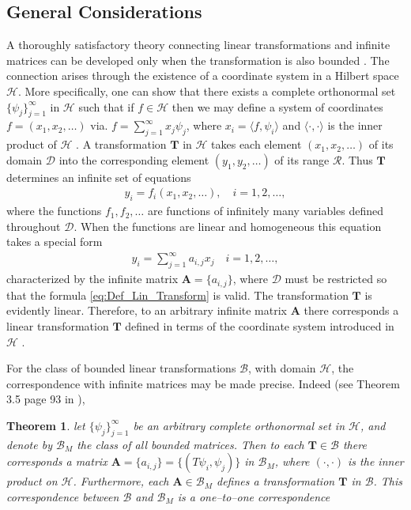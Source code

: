 \documentclass[english,12pt]{ttuthes}
\newtheorem{theorem}{Theorem}[chapter]
\begin{document}
\subsection{General Considerations}\label{sec:General_Considerations}
%
A thoroughly satisfactory theory connecting linear transformations and
infinite matrices can be developed only when the transformation is also
bounded \cite{Stone:64}. The connection arises through the existence of a
coordinate system in a Hilbert space $\mathscr{H}$. More specifically,
one can show that there exists a complete orthonormal set
$\{\psi_j\}_{j=1}^\infty$ in $\mathscr{H}$ such that if $f\in\mathscr{H}$ then we 
may define a system of coordinates $f=(x_1,x_2,\ldots)$
via. $f=\sum_{j=1}^\infty x_j\psi_j$, where $x_i=\langle f,\psi_i\rangle$ and $\langle\cdot,\cdot\rangle$ is the
inner product of $\mathscr{H}$ \cite{Stone:64}. A transformation
$\mathbf{T}$ in $\mathscr{H}$ takes each element $(x_1,x_2,\ldots)$ of its
domain $\mathcal{D}$ into the corresponding element $(y_1,y_2,\ldots)$ of
its range $\mathcal{R}$. Thus $\mathbf{T}$ determines an infinite set of
equations 
%
\begin{align}
  y_i=f_i(x_1,x_2,\ldots), \quad i=1,2,\ldots,
\end{align}
%
where the functions $f_1,f_2,\ldots$ are functions of infinitely many
variables defined throughout $\mathcal{D}$. When the functions are
linear and homogeneous this equation takes a special form
%
\begin{align}\label{eq:Def_Lin_Transform}
  y_i=\sum_{j=1}^\infty a_{i,j}x_j \quad i=1,2,\ldots,
\end{align}
%
characterized by the infinite matrix $\mathbf{A}=\{a_{i,j}\}$, where
$\mathcal{D}$ must be restricted so that the formula
\eqref{eq:Def_Lin_Transform} is valid. The transformation $\mathbf{T}$
is evidently linear. Therefore, to an arbitrary infinite matrix
$\mathbf{A}$ there corresponds a linear transformation $\mathbf{T}$
defined in terms of the coordinate system introduced in $\mathscr{H}$
\cite{Stone:64}. 

For the class of bounded linear transformations $\mathcal{B}$, with
domain $\mathscr{H}$, the correspondence with infinite matrices may be
made precise. Indeed (see Theorem 3.5 page 93 in \cite{Stone:64}),
%
\begin{theorem}\label{thm:Bnd_Lin_Op_Matrix}
%
let $\{\psi_j\}_{j=1}^\infty$ be an arbitrary complete
orthonormal set in $\mathscr{H}$, and denote 
by $\mathcal{B}_M$ the class of all bounded matrices. Then to each
$\mathbf{T}\in\mathcal{B}$ there corresponds a matrix
$\mathbf{A}=\{a_{i,j}\}=\{(T\psi_i,\psi_j)\}$ in $\mathcal{B}_M$, where $(\cdot,\cdot)$
is the inner product on $\mathscr{H}$. Furthermore, each
$\mathbf{A}\in\mathcal{B}_M$ defines a transformation $\mathbf{T}$ in
$\mathcal{B}$. This correspondence between $\mathcal{B}$ and
$\mathcal{B}_M$ is a one--to--one correspondence
%
\end{theorem}
     
\end{document}

